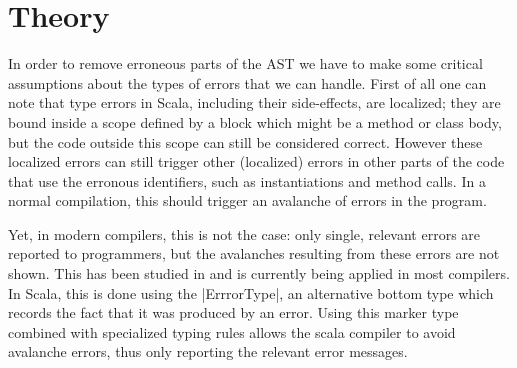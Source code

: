 \section{Theory}


In order to remove erroneous parts of the AST we have to make some critical assumptions about the types of errors that we can handle. First of all one can note that type errors in Scala, including their side-effects, are localized; they are bound inside a scope defined by a block which might be a method or class body, but the code outside this scope can still be considered correct. However these localized errors can still trigger other (localized) errors in other parts of the code that use the erronous identifiers, such as instantiations and method calls. In a normal compilation, this should trigger an avalanche of errors in the program.

Yet, in modern compilers, this is not the case: only single, relevant errors are reported to programmers, but the avalanches resulting from these errors are not shown. This has been studied in \cite{spurious} and is currently being applied in most compilers. In Scala, this is done using the |ErrrorType|, an alternative bottom type which records the fact that it was produced by an error. Using this marker type combined with specialized typing rules allows the scala compiler to avoid avalanche errors, thus only reporting the relevant error messages.

